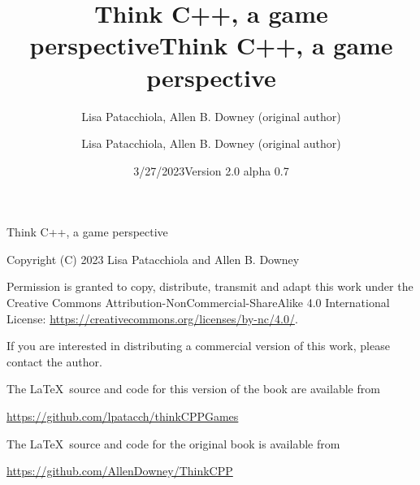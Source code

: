 \documentclass{book}
\title{Think C++, a game perspective}
\author{Lisa Patacchiola, Allen B. Downey (original author)}
\date{3/27/2023}
\begin{document}
\title {Think C++, a game perspective}
\author {Lisa Patacchiola, Allen B. Downey (original author)}
\date {Version 2.0 alpha 0.7}
\maketitle

\vspace{2in}
\begin{center}
{\Large Think C++, a game perspective}

\vspace{0.25in}

Copyright (C) 2023 Lisa Patacchiola and Allen B. Downey
\end{center}
\vspace{0.25in}

Permission is granted to copy, distribute, transmit and adapt this
work under the Creative Commons Attribution-NonCommercial-ShareAlike 4.0
International License: \url{https://creativecommons.org/licenses/by-nc/4.0/}.

If you are interested in distributing a commercial version of this
work, please contact the author.

\bigskip
The \LaTeX\ source and code for this version of the book are available from

\bigskip
\url{https://github.com/lpatacch/thinkCPPGames}

\bigskip
The \LaTeX\ source and code for the original book is available from

\bigskip
\url{https://github.com/AllenDowney/ThinkCPP}



\frontmatter

\tableofcontents

\mainmatter




















\appendix


\printindex
\end{document}
